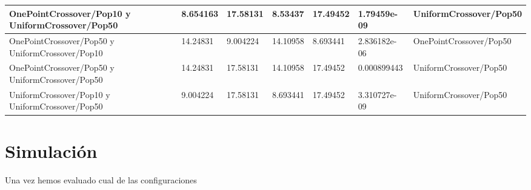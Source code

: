\begin{table}
{\begin{tabular}{lllllll}
    OnePointCrossover/Pop10 y UniformCrossover/Pop50                    & 8.654163              & 17.58131              & 8.53437               & 17.49452              & 1.79459e-09                                           & UniformCrossover/Pop50                                \\ \hline
    OnePointCrossover/Pop50 y UniformCrossover/Pop10                    & 14.24831              & 9.004224              & 14.10958              & 8.693441              & 2.836182e-06                                          & OnePointCrossover/Pop50                               \\ \hline
    OnePointCrossover/Pop50 y UniformCrossover/Pop50                    & 14.24831              & 17.58131              & 14.10958              & 17.49452              & 0.000899443                                           & UniformCrossover/Pop50                                \\ \hline
    UniformCrossover/Pop10 y UniformCrossover/Pop50                     & 9.004224              & 17.58131              & 8.693441              & 17.49452              & 3.310727e-09                                          & UniformCrossover/Pop50                                \\ \hline
    \end{tabular}}
\end{table}




\section{Simulación}

Una vez hemos evaluado cual de las configuraciones 

